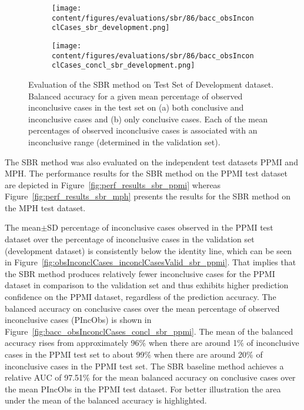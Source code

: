 \begin{figure}[ht]
    \begin{subfigure}{0.9\textwidth}
      \centering
      \texttt{[image: content/figures/evaluations/sbr/86/bacc\_obsInconclCases\_sbr\_development.png]}
      \subcaption{}
      \label{fig:bacc_obsInconclCases_sbr_development}
    \end{subfigure}
    \hfill
    \begin{subfigure}{0.9\textwidth}
      \centering
      \texttt{[image: content/figures/evaluations/sbr/86/bacc\_obsInconclCases\_concl\_sbr\_development.png]}
      \subcaption{}
      \label{fig:bacc_obsInconclCases_concl_sbr_development}
    \end{subfigure}

    \caption{Evaluation of the SBR method on Test Set of Development dataset.
    Balanced accuracy for a given mean percentage of observed inconclusive cases in the test set on 
    (a) both conclusive and inconclusive cases and (b) only conclusive cases. 
    Each of the mean percentages of observed inconclusive cases is associated with an inconclusive range (determined in the validation set). }
    \label{fig:bacc_obsInconclCases_sbr_development_full}
\end{figure}



The SBR method was also evaluated on the independent test datasets PPMI and MPH.
The performance results for the SBR method on the PPMI test dataset are depicted in Figure~\ref{fig:perf_results_sbr_ppmi} 
whereas Figure~\ref{fig:perf_results_sbr_mph} presents the results for the SBR method on the MPH test dataset.


The mean$\pm$SD percentage of inconclusive cases observed in the PPMI test dataset 
over the percentage of inconclusive cases in the validation set (development dataset) 
is consistently below the identity line, 
which can be seen in Figure~\ref{fig:obsInconclCases_inconclCasesValid_sbr_ppmi}.
That implies that the SBR method produces relatively fewer inconclusive cases for the PPMI dataset  
in comparison to the validation set and thus exhibits higher prediction confidence on the PPMI dataset, 
regardless of the prediction accuracy.
The balanced accuracy on conclusive cases over the mean percentage of observed inconclusive cases (PIncObs) is shown 
in Figure~\ref{fig:bacc_obsInconclCases_concl_sbr_ppmi}.
The mean of the balanced accuracy rises from approximately 96\% 
when there are around 1\% of inconclusive cases in the PPMI test set to about 99\% 
when there are around 20\% of inconclusive cases in the PPMI test set.
The SBR baseline method achieves a relative AUC of 97.51\% for the mean balanced accuracy on conclusive cases 
over the mean PIncObs in the PPMI test dataset.
For better illustration the area under the mean of the balanced accuracy is highlighted.


